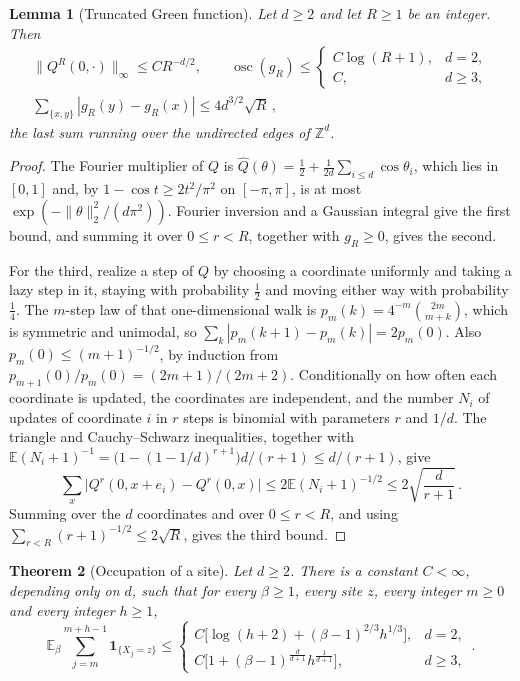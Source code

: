 \documentclass[11pt]{amsart}
\theoremstyle{plain}
\newtheorem{theorem}{Theorem}[section]
\newtheorem{lemma}[theorem]{Lemma}
\theoremstyle{definition}
\newcommand{\Z}{\mathbb Z}
\newcommand{\E}{\mathbb E}
\newcommand{\one}{\mathbf 1}
\begin{document}
	\begin{lemma}[Truncated Green function]\label{lem:green}
		Let $d\geq2$ and let $R\geq1$ be an integer.  Then
		\[
			\begin{gathered}
			\|Q^R(0,\cdot)\|_\infty\leq CR^{-d/2},
			\qquad
			\operatorname{osc}(g_R)\leq
			\begin{cases}
				C\log(R+1),&d=2,\\
				C,&d\geq3,
			\end{cases}
			\\
			\sum_{\{x,y\}}|g_R(y)-g_R(x)|\leq4d^{3/2}\sqrt R\, ,
			\end{gathered}
		\]
		the last sum running over the undirected edges of $\Z^d$.
	\end{lemma}

	\begin{proof}
		The Fourier multiplier of $Q$ is
		$\widehat Q(\theta)=\frac12+\frac1{2d}\sum_{i\leq d}\cos\theta_i$, which
		lies in $[0,1]$ and, by $1-\cos t\geq2t^2/\pi^2$ on $[-\pi,\pi]$, is at
		most $\exp(-\|\theta\|_2^2/(d\pi^2))$.  Fourier inversion and a Gaussian
		integral give the first bound, and summing it over $0\leq r<R$, together
		with $g_R\geq0$, gives the second.

		For the third, realize a step of $Q$ by choosing a coordinate uniformly
		and taking a lazy step in it, staying with probability $\frac12$ and
		moving either way with probability $\frac14$.  The $m$-step law of that
		one-dimensional walk is $p_m(k)=4^{-m}\binom{2m}{m+k}$, which is symmetric
		and unimodal, so $\sum_k|p_m(k+1)-p_m(k)|=2p_m(0)$.  Also
		$p_m(0)\leq(m+1)^{-1/2}$, by induction from
		$p_{m+1}(0)/p_m(0)=(2m+1)/(2m+2)$.  Conditionally on how often each
		coordinate is updated, the coordinates are independent, and the number
		$N_i$ of updates of coordinate $i$ in $r$ steps is binomial with
		parameters $r$ and $1/d$. The triangle and Cauchy--Schwarz inequalities,
		together with
		$\E(N_i+1)^{-1}=\bigl(1-(1-1/d)^{r+1}\bigr)d/(r+1)\leq d/(r+1)$,
		give
		\[
		\sum_x\bigl|Q^r(0,x+e_i)-Q^r(0,x)\bigr|
		\leq2\E(N_i+1)^{-1/2}
		\leq2\sqrt{\frac d{r+1}}\, .
		\]
		Summing over the $d$ coordinates and over $0\leq r<R$, and using
		$\sum_{r<R}(r+1)^{-1/2}\leq2\sqrt R$, gives the third bound.
	\end{proof}

	\begin{theorem}[Occupation of a site]\label{thm:return}
		Let $d\geq2$.  There is a constant $C<\infty$, depending only on $d$, such
		that for every $\beta\geq1$, every site $z$, every integer $m\geq0$ and
		every integer $h\geq1$,
		\begin{equation}\label{eq:occupation}
			\E_\beta\sum_{j=m}^{m+h-1}\one_{\{X_j=z\}}
			\leq
			\begin{cases}
				C\bigl[\log(h+2)+(\beta-1)^{2/3}h^{1/3}\bigr],&d=2,\\
				C\bigl[1+(\beta-1)^{\frac{d}{d+1}}h^{\frac{1}{d+1}}\bigr],&d\geq3,
			\end{cases}\, .
		\end{equation}
	\end{theorem}
\end{document}
